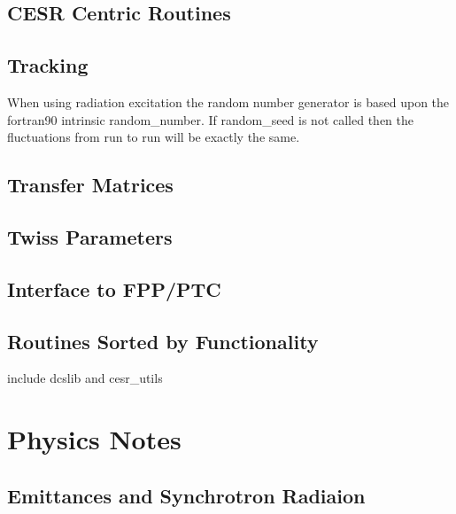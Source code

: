 \documentclass{book}
\begin{document}
\chapter{CESR Centric Routines}

\chapter{Tracking}

When using radiation excitation the random number generator is based
upon the fortran90 intrinsic random_number. If random_seed is not called
then the fluctuations from run to run will be exactly the same.

\chapter{Transfer Matrices}

\chapter{Twiss Parameters}

\chapter{Interface to FPP/PTC}

\chapter{Routines Sorted by Functionality}

include dcslib and cesr_utils

\part{Physics Notes}

\chapter{Emittances and Synchrotron Radiaion}



\begin{theindex}


\end{theindex}
\end{document}
